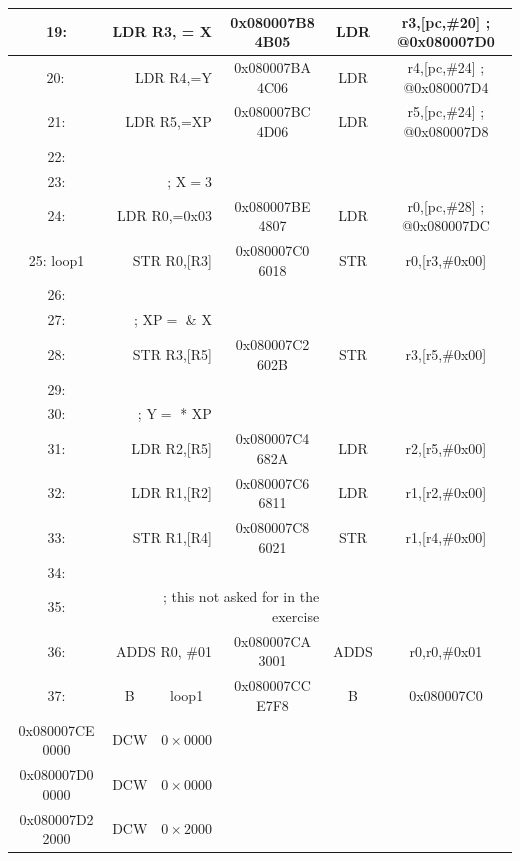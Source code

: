 \documentclass[10pt]{article}
\begin{document}
\begin{center}
\begin{tabular}{|c|c|c|c|c|c|}
\hline
19: & \multicolumn{2}{|r|}{LDR R3, = X} & 0x080007B8 4B05 & LDR & r3,[pc,\#20] ; @0x080007D0 \\
\hline
$20:$ & \multicolumn{2}{|r|}{LDR R4,=Y} & 0x080007BA 4C06 & LDR & r4,[pc,\#24] ; @0x080007D4 \\
\hline
21: & \multicolumn{2}{|r|}{LDR R5,=XP} & 0x080007BC 4D06 & LDR & r5,[pc,\#24] ; @0x080007D8 \\
\hline
22: &  &  &  &  &  \\
\hline
23: & \multicolumn{2}{|r|}{; $\mathrm{X}=3$} &  &  &  \\
\hline
24: & \multicolumn{2}{|r|}{LDR R0,=0x03} & 0x080007BE 4807 & LDR & r0,[pc,\#28] ; @0x080007DC \\
\hline
25: loop1 & \multicolumn{2}{|r|}{STR R0,[R3]} & 0x080007C0 6018 & STR & r0,[r3,\#0x00] \\
\hline
26: &  &  &  &  &  \\
\hline
27: & \multicolumn{2}{|r|}{; $\mathrm{XP}=$ \& X} &  &  &  \\
\hline
28: & \multicolumn{2}{|r|}{STR R3,[R5]} & 0x080007C2 602B & STR & r3,[r5,\#0x00] \\
\hline
29: &  &  &  &  &  \\
\hline
30: & \multicolumn{2}{|r|}{; $\mathrm{Y}=$ * XP} &  &  &  \\
\hline
31: & \multicolumn{2}{|r|}{LDR R2,[R5]} & 0x080007C4 682A & LDR & r2,[r5,\#0x00] \\
\hline
32: & \multicolumn{2}{|r|}{LDR R1,[R2]} & 0x080007C6 6811 & LDR & r1,[r2,\#0x00] \\
\hline
33: & \multicolumn{2}{|r|}{STR R1,[R4]} & 0x080007C8 6021 & STR & r1,[r4,\#0x00] \\
\hline
34: &  &  &  &  &  \\
\hline
35: & \multicolumn{3}{|r|}{; this not asked for in the exercise} &  &  \\
\hline
36: & \multicolumn{2}{|r|}{ADDS R0, \#01} & 0x080007CA 3001 & ADDS & r0,r0,\#0x01 \\
\hline
37: & B & loop1 & 0x080007CC E7F8 & B & 0x080007C0 \\
\hline
0x080007CE 0000 & DCW & $0 \times 0000$ &  &  &  \\
\hline
0x080007D0 0000 & DCW & $0 \times 0000$ &  &  &  \\
\hline
0x080007D2 2000 & DCW & $0 \times 2000$ &  &  &  \\

\end{tabular}
\end{center}
\end{document}
